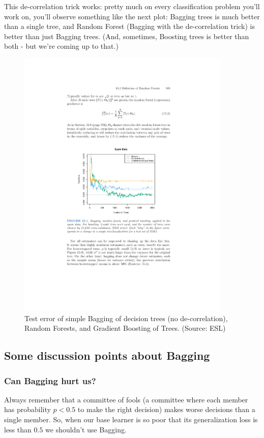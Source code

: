 \documentclass[11pt]{article}
\begin{document}
\noindent
This de-correlation trick works: pretty much on every classification problem
you'll work on, you'll observe something like the next plot: Bagging trees is
much better than a single tree, and Random Forest (Bagging with the
de-correlation trick) is better than just Bagging trees. (And, sometimes,
Boosting trees is better than both - but we're coming up to that.)


\begin{figure}[H]
  \centering
  \includegraphics[width=4in]{bagging_vs_rf.pdf}
  \caption{Test error of simple Bagging of decision trees (no de-correlation),
  Random Forests, and Gradient Boosting of Trees. (Source: ESL)}
\end{figure}

\subsection{Some discussion points about Bagging}

\subsubsection*{Can Bagging hurt us?}

Always remember that a committee of fools (a committee where each member has
probability $p<0.5$ to make the right decision) makes worse decisions than a
single member. So, when our base learner is so poor that its generalization loss
is less
than $0.5$ we shouldn't use Bagging.
\end{document}
